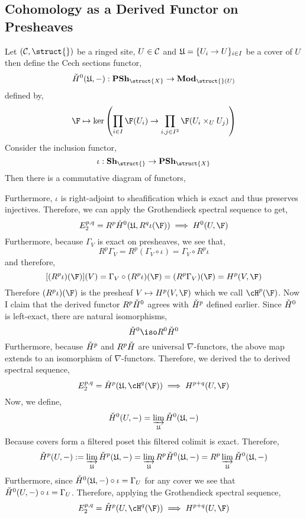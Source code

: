 \documentclass[12pt]{article}
\begin{document}
\subsection{\cech Cohomology as a Derived Functor on Presheaves}



Let $(\C, \struct{})$ be a ringed site, $U \in \mathcal{C}$ and $\mathfrak{U} = \{ U_i \to U \}_{i \in I}$ be a cover of $U$ then define the Cech sections functor,
\[ \check{H}^0(\fU, -) : \mathbf{PSh}_{\struct{X}} \to \mathbf{Mod}_{\struct{}(U)} \]
defined by,
\[ \F \mapsto \ker{\left( \prod_{i \in I} \F(U_i) \to \prod_{i,j \in I^2} \F(U_i \times_U U_j) \right)} \]
Consider the inclusion functor,
\[ \iota : \mathbf{Sh}_{\struct{}} \to \mathbf{PSh}_{\struct{X}} \]
Then there is a commutative diagram of functors,
\begin{center}
\end{center}
Furthermore, $\iota$ is right-adjoint to sheafification which is exact and thus preserves injectives. Therefore, we can apply the Grothendieck spectral sequence to get,
\[ E_2^{p,q} = R^p \cechH^0(\fU, R^q \iota(\F)) \implies H^0(U, \F) \]
Furthermore, because $\Gamma_V$ is exact on presheaves, we see that,
\[ R^p \Gamma_V =  R^p (\Gamma_V \circ \iota) = \Gamma_V \circ R^p \iota  \]
and therefore,
\[ [(R^p \iota)(\F)](V) = \Gamma_V \circ (R^p \iota)(\F) = (R^p \Gamma_V)(\F) = H^p(V, \F) \]
Therefore $(R^p \iota)(\F)$ is the presheaf $V \mapsto H^p(V, \F)$ which we call $\cH^p(\F)$. Now I claim that the derived functor $R^p \check{H}^0$ agrees with $\check{H}^p$ defined earlier. Since $\check{H}^0$ is left-exact, there are natural isomorphisms,
\[ \cechH^0 \iso R^0 \cechH^0 \] 
Furthermore, because $\check{H}^p$ and $R^p \check{H}$ are universal $\nabla$-functors, the above map extends to an isomorphism of $\nabla$-functors. Therefore, we derived the \cech to derived spectral sequence,
\[ E_2^{p,q} = \cechH^p(\fU, \cH^q(\F)) \implies H^{p+q}(U, \F) \]
Now, we define,
\[ \check{H}^0(U, -) = \varinjlim_{\mathfrak{U}} \check{H}^0(\mathfrak{U}, -) \]
Because covers form a filtered poset this filtered colimit is exact. Therefore,
\[ \check{H}^p(U, -) := \varinjlim_{\mathfrak{U}} \check{H}^p(\mathfrak{U}, -) = \varinjlim_{\mathfrak{U}} R^p \check{H}^0(\mathfrak{U}, -) = R^p \varinjlim_{\mathfrak{U}} \check{H}^0(\mathfrak{U}, -) \]
Furthermore, since $\check{H}^0(\mathfrak{U},-) \circ \iota = \Gamma_U$ for any cover we see that $\check{H}^0(U,-) \circ \iota = \Gamma_U$. Therefore, applying the Grothendieck spectral sequence,
\[ E^{p,q}_2 = \cechH^p(U, \cH^q(\F)) \implies H^{p+q}(U, \F) \]
\end{document}
